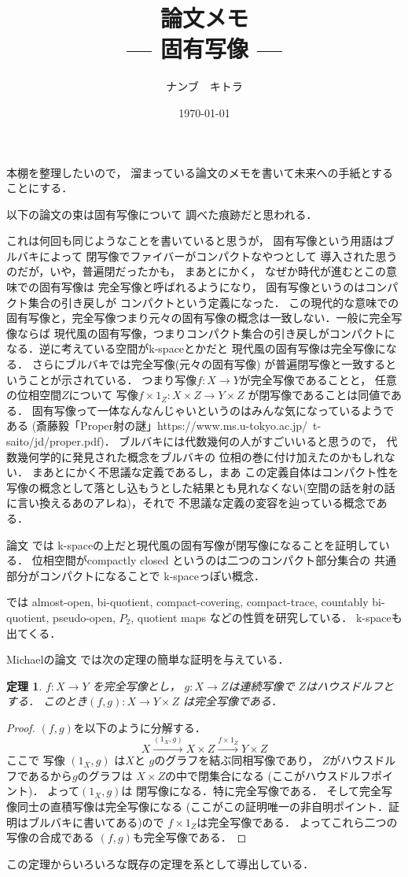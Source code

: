 \documentclass[leqno, a4paper, 12pt]{jsarticle}
\title{論文メモ
\large{\\--- 固有写像 ---}
}
\author{ナンブ　キトラ}
\date{\today}
\newtheorem{thm}{定理}
\begin{document}
\maketitle

本棚を整理したいので，
溜まっている論文のメモを書いて未来への手紙とすることにする．

以下の論文の束は固有写像について
調べた痕跡だと思われる．


これは何回も同じようなことを書いていると思うが，
固有写像という用語はブルバキによって
閉写像でファイバーがコンパクトなやつとして
導入された思うのだが，いや，普遍閉だったかも，
まあとにかく，
なぜか時代が進むとこの意味での固有写像は
完全写像と呼ばれるようになり，
固有写像というのはコンパクト集合の引き戻しが
コンパクトという定義になった．
この現代的な意味での固有写像と，完全写像つまり元々の固有写像の概念は一致しない．一般に完全写像ならば
現代風の固有写像，つまりコンパクト集合の引き戻しがコンパクトになる．逆に考えている空間がk-spaceとかだと
現代風の固有写像は完全写像になる．
さらにブルバキでは完全写像(元々の固有写像)
が普遍閉写像と一致するということが示されている．
つまり写像$f\colon X\to Y$が完全写像であることと，
任意の位相空間$Z$について
写像$f\times 1_{Z}\colon X\times Z\to Y\times Z$
が閉写像であることは同値である．
固有写像って一体なんなんじゃいというのはみんな気になっているようである
(斎藤毅「Proper射の謎」https://www.ms.u-tokyo.ac.jp/~t-saito/jd/proper.pdf)．
ブルバキには代数幾何の人がすごいいると思うので，
代数幾何学的に発見された概念をブルバキの
位相の巻に付け加えたのかもしれない．
まあとにかく不思議な定義であるし，まあ
この定義自体はコンパクト性を写像の概念として落とし込もうとした結果とも見れなくない(空間の話を射の話に言い換えるあのアレね)，それで
不思議な定義の変容を辿っている概念である．



論文
\cite{MR0254818}
では
k-spaceの上だと現代風の固有写像が閉写像になることを証明している．
位相空間がcompactly closed 
というのは二つのコンパクト部分集合の
共通部分がコンパクトになることで
k-spaceっぽい概念．

\cite{MR0282347}
では
almost-open, 
bi-quotient, 
compact-covering, 
compact-trace, 
countably bi-quotient, 
pseudo-open, 
$P_{2}$, 
quotient  maps
などの性質を研究している．
k-spaceも出てくる．

Michaelの論文
\cite{MR0275387}
では次の定理の簡単な証明を与えている．
\begin{thm}
$f\colon X\to Y$
を完全写像とし，
$g\colon X\to Z$は連続写像で
$Z$はハウスドルフとする．
このとき$(f, g)\colon X\to Y\times Z$
は完全写像である．
\end{thm}
\begin{proof}
$(f, g)$を以下のように分解する．
\[
X\xrightarrow{(1_{X}, g)} X\times Z
\xrightarrow{f\times 1_{Z}} Y\times Z
\]
ここで
写像
$(1_{X}, g)$
は$X$と
$g$のグラフを結ぶ同相写像であり，
$Z$がハウスドルフであるから$g$のグラフは
$X\times Z$の中で閉集合になる
(ここがハウスドルフポイント)．
よって$(1_{X}, g)$は
閉写像になる．特に完全写像である．
そして完全写像同士の直積写像は完全写像になる
(ここがこの証明唯一の非自明ポイント．証明はブルバキに書いてある)ので
$f\times 1_{Z}$は完全写像である．
よってこれら二つの写像の合成である
$(f, g)$も完全写像である．
\end{proof}
この定理からいろいろな既存の定理を系として導出している．
\end{document}
